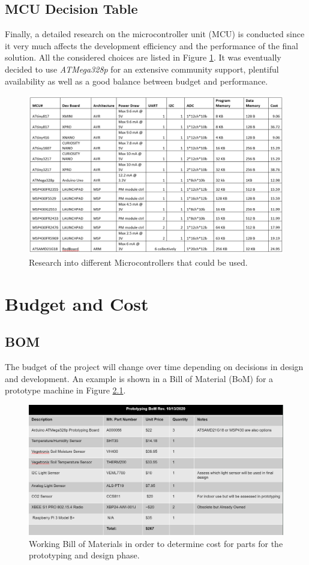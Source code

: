 \documentclass{report}
\begin{document}
\section{MCU Decision Table}
Finally, a detailed research on the microcontroller unit (MCU) is conducted since it very much affects the development efficiency and the performance of the final solution. All the considered choices are listed in Figure \ref{fig:mcu_decide}. It was eventually decided to use \textit{ATMega328p} for an extensive community support, plentiful availability as well as a good balance between budget and performance.
\begin{figure}[H]
    \centering
    \includegraphics[width=15cm]{PNGs/MCU.PNG}
    \caption{Research into different Microcontrollers that could be used.}
    \label{fig:mcu_decide}
\end{figure}
\chapter{Budget and Cost}
\section{BOM}
The budget of the project will change over time depending on decisions in design and development. An example is shown in a Bill of Material (BoM) for a prototype machine in Figure \ref{fig:bom}.
\begin{figure}[H]
    \centering
    \includegraphics[width=15cm]{PNGs/PartsList.PNG}
    \caption{Working Bill of Materials in order to determine cost for parts for the prototyping and design phase.}
    \label{fig:bom}
\end{figure}
\end{document}
